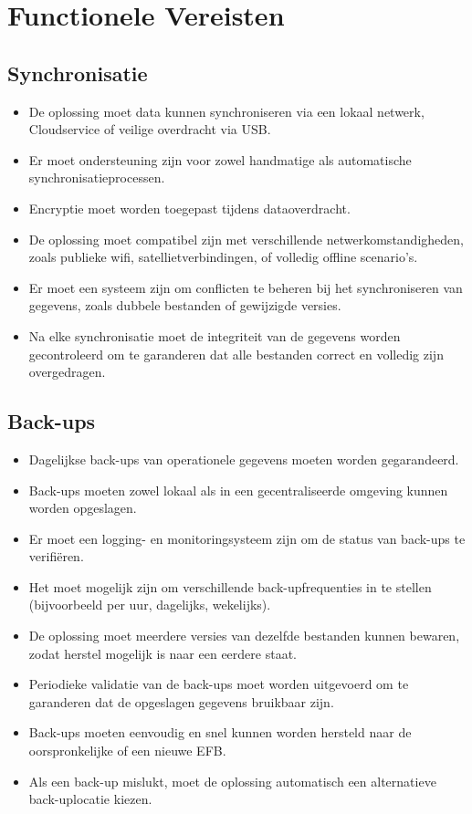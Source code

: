 \documentclass{hogent-article}
\begin{document}
    \section{Functionele Vereisten}
    
    \subsection{Synchronisatie}
    \begin{itemize}
        \item De oplossing moet data kunnen synchroniseren via een lokaal netwerk, Cloudservice of veilige overdracht via USB.
        \item Er moet ondersteuning zijn voor zowel handmatige als automatische synchronisatieprocessen.
        \item Encryptie moet worden toegepast tijdens dataoverdracht.
        \item De oplossing moet compatibel zijn met verschillende netwerkomstandigheden, zoals publieke wifi, satellietverbindingen, of volledig offline scenario's.
        \item Er moet een systeem zijn om conflicten te beheren bij het synchroniseren van gegevens, zoals dubbele bestanden of gewijzigde versies.
        \item Na elke synchronisatie moet de integriteit van de gegevens worden gecontroleerd om te garanderen dat alle bestanden correct en volledig zijn overgedragen.
    \end{itemize}
    
    \subsection{Back-ups}
    \begin{itemize}
        \item Dagelijkse back-ups van operationele gegevens moeten worden gegarandeerd.
        \item Back-ups moeten zowel lokaal als in een gecentraliseerde omgeving kunnen worden opgeslagen.
        \item Er moet een logging- en monitoringsysteem zijn om de status van back-ups te verifiëren.
        \item Het moet mogelijk zijn om verschillende back-upfrequenties in te stellen (bijvoorbeeld per uur, dagelijks, wekelijks).
        \item De oplossing moet meerdere versies van dezelfde bestanden kunnen bewaren, zodat herstel mogelijk is naar een eerdere staat.
        \item Periodieke validatie van de back-ups moet worden uitgevoerd om te garanderen dat de opgeslagen gegevens bruikbaar zijn.
        \item Back-ups moeten eenvoudig en snel kunnen worden hersteld naar de oorspronkelijke of een nieuwe EFB.
        \item Als een back-up mislukt, moet de oplossing automatisch een alternatieve back-uplocatie kiezen.
    \end{itemize}
    
\end{document}
